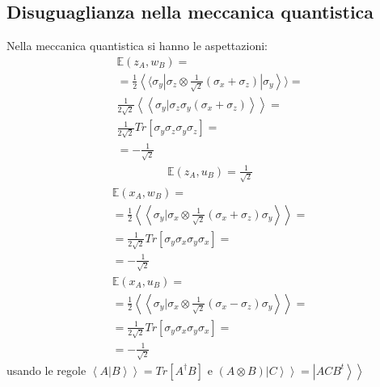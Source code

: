 \subsection{Disuguaglianza nella meccanica quantistica} %
Nella meccanica quantistica si hanno le aspettazioni:
\begin{equation}\begin{split}
\mathbb{E}\left(z_A,w_B\right)=\\
=\frac{1}{2}\left\langle\langle \sigma_y\right |\sigma_z\otimes\frac{1}{\sqrt{2}}\left(\sigma_x+\sigma_z\right)\left |\sigma_y \right\rangle\rangle=\\
\frac{1}{2\sqrt{2}}\left\langle\left\langle \sigma_y|\sigma_z\sigma_y\left(\sigma_x+\sigma_z\right) \right\rangle\right\rangle=\\
\frac{1}{2\sqrt{2}}Tr\left[\sigma_y\sigma_z\sigma_y\sigma_z\right]=\\
=-\frac{1}{\sqrt{2}}
\end{split}\end{equation}
\begin{equation}\begin{split}
\mathbb{E}\left(z_A,u_B\right)=\frac{1}{\sqrt{2}}
\end{split}\end{equation}
\begin{equation}\begin{split}
\mathbb{E}\left(x_A,w_B\right)=\\
=\frac{1}{2}\left\langle\left\langle \sigma_y|\sigma_x\otimes\frac{1}{\sqrt{2}}\left(\sigma_x+\sigma_z\right)\sigma_y \right\rangle\right\rangle=\\
=\frac{1}{2\sqrt{2}}Tr\left[\sigma_y\sigma_x\sigma_y\sigma_x\right]=\\
=-\frac{1}{\sqrt{2}}
\end{split}\end{equation}
\begin{equation}\begin{split}
\mathbb{E}\left(x_A,u_B\right)=\\
=\frac{1}{2}\left\langle\left\langle \sigma_y|\sigma_x\otimes\frac{1}{\sqrt{2}}\left(\sigma_x-\sigma_z\right)\sigma_y \right\rangle\right\rangle=\\
=\frac{1}{2\sqrt{2}}Tr\left[\sigma_y\sigma_x\sigma_y\sigma_x\right]=\\
=-\frac{1}{\sqrt{2}}
\end{split}\end{equation}
usando le regole $\left.\left\langle A|B \right\rangle\right\rangle=Tr\left[A^{\dag}B\right]$ e $\left(A\otimes B\right)\left.\left |C \right\rangle\right\rangle=\left.\left |ACB^{t} \right\rangle\right\rangle$

